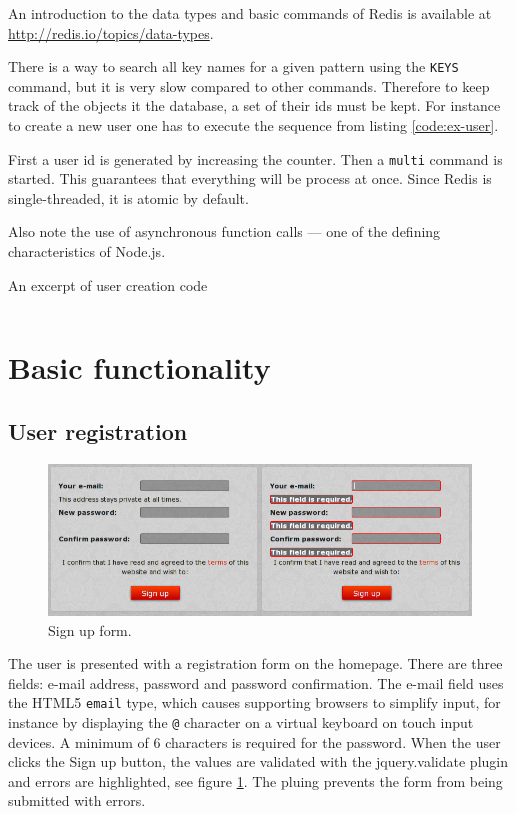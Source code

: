 \documentclass[12pt,oneside]{fithesis}
\begin{document}
	
	An introduction to the data types and basic commands of Redis is available at \url{http://redis.io/topics/data-types}.
	
	There is a way to search all key names for a given pattern using the \texttt{KEYS} command, but it is very slow compared to other commands. Therefore to keep track of the objects it the database, a set of their ids must be kept. For instance to create a new user one has to execute the sequence from listing \ref{code:ex-user}.
	
	First a user id is generated by increasing the counter. Then a \texttt{multi} command is started. This guarantees that everything will be process at once. Since Redis is single-threaded, it is atomic by default.
	
	Also note the use of asynchronous function calls --- one of the defining characteristics of Node.js.
	\begin{program}[h!]
	\caption{An excerpt of user creation code}
	\label{code:ex-user}
	\inputminted[fontsize=\footnotesize, linenos=false]{javascript}{ex-user.js}
	\end{program}
	
	
\section{Basic functionality}
	\subsection{User registration}	
	  \begin{figure}[h]
	  \centering
	    \includegraphics[width=1.0\textwidth]{screen-signup.png}
		  \caption{Sign up form.}
		  \label{fig:screen-signup}
	  \end{figure}
		The user is presented with a registration form on the homepage. There are three fields: e-mail address, password and password confirmation. The e-mail field uses the HTML5 \texttt{email} type, which causes supporting browsers to simplify input, for instance by displaying the \texttt{@} character on a virtual keyboard on touch input devices. A minimum of 6 characters is required for the password. When the user clicks the Sign up button, the values are validated with the jquery.validate plugin and errors are highlighted, see figure \ref{fig:screen-signup}. The pluing prevents the form from being submitted with errors.
		
\end{document}
